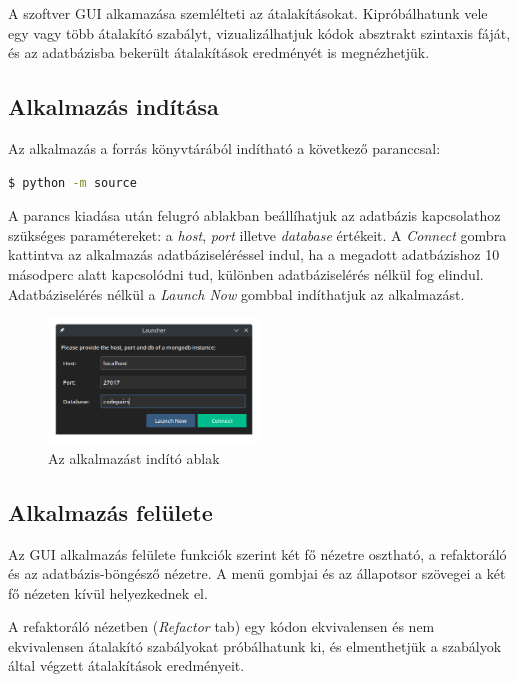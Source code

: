 A szoftver GUI alkamazása szemlélteti az átalakításokat.
Kipróbálhatunk vele egy vagy több átalakító szabályt,
vizualizálhatjuk kódok absztrakt szintaxis fáját,
és az adatbázisba bekerült átalakítások eredményét is megnézhetjük.

\subsection{Alkalmazás indítása}

Az alkalmazás a forrás könyvtárából indítható a következő paranccsal:

\begin{lstlisting}[language=bash, numbers=none]
	$ python -m source
\end{lstlisting}

A parancs kiadása után felugró ablakban beállíhatjuk az adatbázis kapcsolathoz szükséges paramétereket:
a \emph{host}, \emph{port} illetve \emph{database} értékeit.
A \emph{Connect} gombra kattintva az alkalmazás adatbáziseléréssel indul,
ha a megadott adatbázishoz 10 másodperc alatt kapcsolódni tud, különben adatbáziselérés nélkül
fog elindul.
Adatbáziselérés nélkül a \emph{Launch Now} gombbal indíthatjuk az alkalmazást.

\begin{figure}[H]
	\centering
	\includegraphics[width=0.5\textwidth]{images/screenshots/launcher.png}
	\caption{Az alkalmazást indító ablak}
\end{figure}

\subsection{Alkalmazás felülete}

Az GUI alkalmazás felülete funkciók szerint két fő nézetre osztható,
a refaktoráló és az adatbázis-böngésző nézetre.
A menü gombjai és az állapotsor szövegei a két fő nézeten kívül helyezkednek el.

A refaktoráló nézetben (\emph{Refactor} tab) egy kódon
ekvivalensen és nem ekvivalensen átalakító szabályokat próbálhatunk ki, és elmenthetjük
a szabályok által végzett átalakítások eredményeit.

